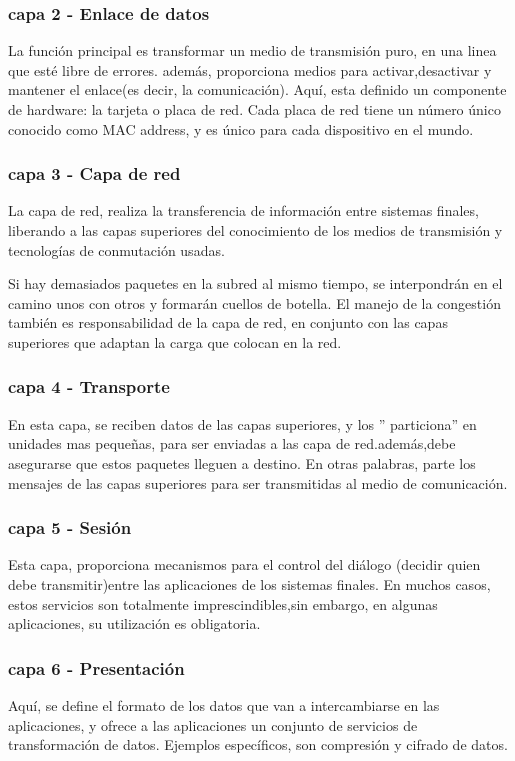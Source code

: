 \subsubsection{capa 2 - Enlace de datos } 
La función principal es transformar un medio de transmisión puro, en una linea que esté libre de errores. además, proporciona medios para activar,desactivar y mantener el enlace(es decir, la comunicación). Aquí, esta definido un componente de hardware: la tarjeta o placa de red. Cada placa de red tiene un número único conocido como MAC address, y es único para cada dispositivo en el mundo. 

\subsubsection{capa 3 - Capa de red}
La capa de red, realiza la transferencia de información entre sistemas finales, liberando a las capas superiores del conocimiento de los medios de transmisión y tecnologías de conmutación usadas. 

Si hay demasiados paquetes en la subred al mismo tiempo, se interpondrán en el camino unos con
otros y formarán cuellos de botella. El manejo de la congestión también es responsabilidad de la capa de
red, en conjunto con las capas superiores que adaptan la carga que colocan en la red.
\subsubsection{capa 4 - Transporte }
En esta capa, se reciben datos de las capas superiores, y los '' particiona'' en unidades mas pequeñas, para ser enviadas a las capa de red.además,debe asegurarse  que estos paquetes lleguen a destino. En otras palabras, parte los mensajes de las capas superiores para ser transmitidas al medio de comunicación. 

\subsubsection{capa 5 - Sesión  }
Esta capa, proporciona mecanismos para el control del diálogo (decidir quien debe transmitir)entre las aplicaciones de los sistemas finales. En muchos casos, estos servicios son totalmente  imprescindibles,sin embargo, en algunas aplicaciones, su utilización es obligatoria. 

\subsubsection{capa 6 - Presentación}
Aquí, se define el formato de los datos que van a intercambiarse en las aplicaciones, y ofrece a las aplicaciones un conjunto de servicios de transformación de datos. Ejemplos específicos, son compresión y cifrado de datos. 


